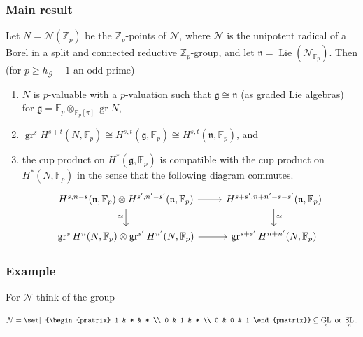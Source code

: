 \documentclass{beamer}
\newcommand*\Z{\mathbb{Z}}
\newcommand*\F{\mathbb{F}}
\DeclareMathOperator{\GL}{GL} %
\DeclareMathOperator{\SL}{SL} %
\DeclareMathOperator{\gr}{gr} %
\DeclareMathOperator{\Lie}{Lie}
\newcommand*{\lie}[1]{\mathfrak{#1}} %
\newcommand*\iso{\cong} %
\newcommand*\gs[1]{\mathcal{#1}}
\newcommand*\pmat[1]{\begin{pmatrix} #1 \end{pmatrix}}
\begin{document}

\begin{frame}[fragile]
  \frametitle{Main result}

  Let $N = \gs{N}(\Z_{p})$ be the $\Z_{p}$-points of $\gs{N}$, where $\gs{N}$ is the unipotent radical of a Borel in a split and connected reductive $\Z_{p}$-group, and let $\lie{n} = \Lie(\gs{N}_{\F_{p}})$. Then (for $p \geq h_{\gs{G}}-1$ an odd prime)
  \begin{enumerate}[$\bullet$]
    \item $N$ is $p$-valuable with a $p$-valuation such that $\lie{g} \iso \lie{n}$ (as graded Lie algebras) for $\lie{g} = \F_{p} \otimes_{\F_{p}[\pi]} \gr N$,
    \item $\gr^{s} H^{s+t}(N,\F_{p}) \iso H^{s,t}(\lie{g},\F_{p}) \iso H^{s,t}(\lie{n},\F_{p})$, and
    \item the cup product on $H^{*}(\lie{g},\F_{p})$ is compatible with the cup product on $H^{*}(N,\F_{p})$ in the sense that the following diagram commutes.
          \[
          \begin{tikzcd}
            H^{s,n-s}(\lie{n},\F_p) \otimes H^{s',n'-s'}(\lie{n},\F_p) \ar[r] \ar[d,swap,"\iso"] & H^{s+s',n+n'-s-s'}(\lie{n},\F_p) \ar[d,"\iso"] \\
            \gr^s H^n(N,\F_p) \otimes \gr^{s'} H^{n'}(N,\F_p) \ar[r] & \gr^{s+s'}H^{n+n'}(N,\F_p)
          \end{tikzcd}
          \]
  \end{enumerate}
\end{frame}


\begin{frame}
  \frametitle{Example}

  For $\gs{N}$ think of the group
  \[
    \gs{N} = \set[\Bigg]{\pmat{1 & * & * \\ 0 & 1 & * \\ 0 & 0 & 1}} \subseteq \GL_n \text{ or  }\SL_{n}.
  \]
\end{frame}




\end{document}
